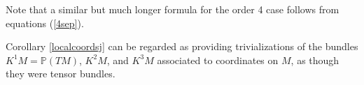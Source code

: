 \documentclass[12pt]{article}
\numberwithin{equation}{section}
\theoremstyle{plain}
\theoremstyle{definition}
\newtheorem{remark}[definition]{Remark}
\renewcommand{\P}{\mathbb{P}}
\begin{document}
Note that a similar but much longer formula for the order 4 case follows from equations (\ref{4sep}).

Corollary \ref{localcoordsj} can be regarded as providing trivializations of the bundles $K^{1}M=\P(TM)$, $K^{2}M$, and $K^{3}M$ associated to coordinates on $M$, as though they were tensor bundles.
\end{document}
